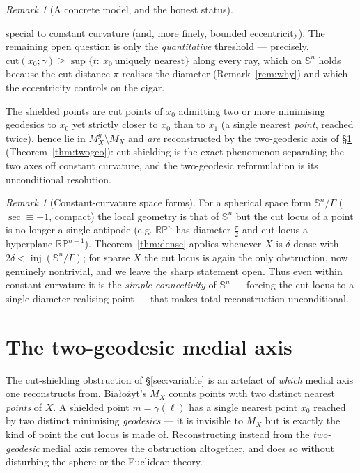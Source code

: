 \documentclass[11pt]{article}
\theoremstyle{remark}
\newtheorem{remark}[theorem]{Remark}
\newcommand{\X}{X}
\newcommand{\Mx}{M_{\X}}
\newcommand{\inj}{\operatorname{inj}}
\newcommand{\Sn}{\mathbb{S}^{n}}
\begin{document}
\begin{remark}[A concrete model, and the honest status]
\begin{itemize}
special to constant curvature (and, more finely, bounded eccentricity). The
remaining open question is only the \emph{quantitative} threshold ---
precisely, $\mathrm{cut}(x_{0};\gamma)\ge\sup\{t:\ x_{0}\ \text{uniquely
nearest}\}$ along every ray, which on $\Sn$ holds because the cut distance
$\pi$ realises the diameter (Remark~\ref{rem:why}) and which the
eccentricity controls on the cigar.
\end{itemize}
The shielded points are cut points of $x_{0}$ admitting two or more
minimising geodesics to $x_{0}$ yet strictly closer to $x_{0}$ than to
$x_{1}$ (a single nearest \emph{point}, reached twice), hence lie in
$\Mx^{g}\setminus\Mx$ and \emph{are} reconstructed by the two-geodesic
axis of \S\ref{sec:twogeo} (Theorem~\ref{thm:twogeo}): cut-shielding is the
exact phenomenon separating the two axes off constant curvature, and the
two-geodesic reformulation is its unconditional resolution.
\end{remark}

\begin{remark}[Constant-curvature space forms]\label{rem:spaceforms}
For a spherical space form $\Sn/\Gamma$ ($\sec\equiv+1$, compact) the
local geometry is that of $\Sn$ but the cut locus of a point is no longer
a single antipode (e.g. $\mathbb{RP}^{n}$ has diameter $\tfrac\pi2$ and
cut locus a hyperplane $\mathbb{RP}^{n-1}$). Theorem~\ref{thm:dense}
applies whenever $\X$ is $\delta$-dense with $2\delta<\inj(\Sn/\Gamma)$;
for sparse $\X$ the cut locus is again the only obstruction, now
genuinely nontrivial, and we leave the sharp statement open. Thus even
within constant curvature it is the \emph{simple connectivity} of $\Sn$
--- forcing the cut locus to a single diameter-realising point --- that
makes total reconstruction unconditional.
\end{remark}

\section{The two-geodesic medial axis}\label{sec:twogeo}

The cut-shielding obstruction of \S\ref{sec:variable} is an artefact of
\emph{which} medial axis one reconstructs from. Bia\l{}o\.zyt's $\Mx$
counts points with two distinct nearest \emph{points} of $\X$. A shielded
point $m=\gamma(\ell)$ has a single nearest point $x_{0}$ reached by two
distinct minimising \emph{geodesics} --- it is invisible to $\Mx$ but is
exactly the kind of point the cut locus is made of. Reconstructing instead
from the \emph{two-geodesic} medial axis removes the obstruction
altogether, and does so without disturbing the sphere or the Euclidean
theory.
\end{document}
